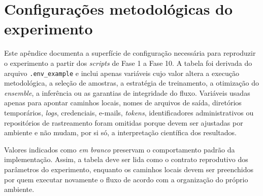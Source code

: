 \chapter{Configurações metodológicas do experimento}\label{ap:configs_reportar}

Este apêndice documenta a superfície de configuração necessária para reproduzir
o experimento a partir dos \textit{scripts} de Fase 1 a Fase 10. A tabela foi derivada do
arquivo \texttt{.env\_example} e inclui apenas variáveis cujo valor altera a
execução metodológica, a seleção de amostras, a estratégia de treinamento, a
otimização do \textit{ensemble}, a inferência ou as garantias de integridade do
fluxo. Variáveis usadas apenas para apontar caminhos locais, nomes de arquivos
de saída, diretórios temporários, \textit{logs}, credenciais, e-mails, \textit{tokens},
identificadores administrativos ou repositórios de rastreamento foram omitidas
porque devem ser ajustadas por ambiente e não mudam, por si só, a interpretação
científica dos resultados.

Valores indicados como \emph{em branco} preservam o comportamento padrão da
implementação. Assim, a tabela deve ser lida como o contrato reprodutivo dos
parâmetros do experimento, enquanto os caminhos locais devem ser preenchidos por
quem executar novamente o fluxo de acordo com a organização do próprio ambiente.

